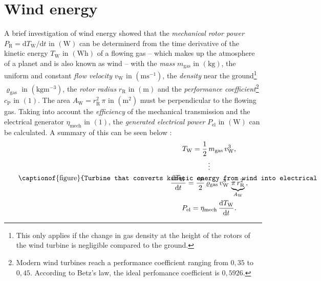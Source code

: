 \section{Wind energy}
A brief investigation of wind energy showed that the \emph{mechanical rotor power} $P_{\mathrm R} = \mathrm{d} T_{\mathrm W}/\mathrm{d} t$ in $\left(\mathrm W \right)$ can be determinerd from the time derivative of the kinetic energy $T_{\mathrm W}$ in $\left(\mathrm{Wh} \right)$ of a flowing gas -- which makes up the atmosphere of a planet and is also known as wind -- with the \emph{mass} $m_{\mathrm {gas}}$ in $\left(\mathrm{kg} \right)$, the uniform and constant \emph{flow velocity} $v_{\mathrm W}$ in $\left(\mathrm{m} \mathrm{s^{-1}}\right)$, the \emph{density} near the ground\footnote{This only applies if the change in gas density at the height of the rotors of the wind turbine is negligible compared to the ground.} $\varrho_{\mathrm {gas}}$ in $\left(\mathrm{kg} \mathrm{m}^{-3}\right)$, the \emph{rotor radius} $r_{\mathrm{R}}$ in $\left(\mathrm{m}\right)$ and the \emph{performance coefficient}\footnote{Modern wind turbines reach a performance coefficient ranging from $0,35$ to $0,45$. According to Betz's law, the ideal perfomance coefficient is $0,5926$.} $c_{\mathrm P}$ in $\left( 1 \right)$. The area $A_\mathrm{W} = r_{\mathrm{R}}^2 \, \pi$ in $\left(\mathrm{m}^2 \right)$ must be perpendicular to the flowing gas. Taking into account the \emph{efficiency} of the mechanical transmission and the electrical generator $\eta_{\mathrm{mech}}$ in $\left( 1 \right)$, the \emph{generated electrical power} $P_{\mathrm{el}}$ in $\left(\mathrm W \right)$ can be calculated. A summary of this can be seen below \cite{Rebhan:2002, Flosdorff:2008, Hau:2016, Gawlik:2018}:
\begin{equation}
	\vcenter{\hbox{\begin{minipage}{.5\textwidth}
		\centering
		
		\captionof{figure}{Turbine that converts kinetic energy from wind into electrical energy. The dashed circle represents the area $A_\mathrm{W}$ that is perpendicular to a flowing gas.}
	\end{minipage}}}
	\qquad\qquad
		\begin{gathered}
		T_{\mathrm W} = \frac{1}{2} \, m_{\mathrm {gas}} \, v_{\mathrm W}^3 \text{,}
		\\
		\vdots
		\\
		\dfrac{\mathrm{d} T_{\mathrm W}}{\mathrm{d} t} = \frac{c_{\mathrm P}}{2} \, \varrho_{\mathrm {gas}} \, v_{\mathrm W}^3 \, \underbrace{\pi \, r_{\mathrm{R}}^2}_{A_\mathrm{W}} \text{,}
		\\
		P_{\mathrm{el}} = \eta_{\mathrm{mech}} \, \dfrac{\mathrm{d} T_{\mathrm W}}{\mathrm{d} t} \text{.}
	\end{gathered}
\end{equation}

